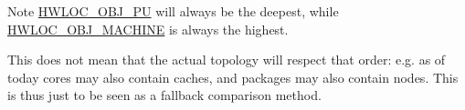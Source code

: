 \begin{DoxyNote}{Note}
\hyperlink{a00184_ggacd37bb612667dc437d66bfb175a8dc55abca6887e80cb291353b0a0c1da83f661}{H\+W\+L\+O\+C\+\_\+\+O\+B\+J\+\_\+\+PU} will always be the deepest, while \hyperlink{a00184_ggacd37bb612667dc437d66bfb175a8dc55a3f4e83ffc4a259354959ae8a9eaa2a80}{H\+W\+L\+O\+C\+\_\+\+O\+B\+J\+\_\+\+M\+A\+C\+H\+I\+NE} is always the highest.

This does not mean that the actual topology will respect that order\+: e.\+g. as of today cores may also contain caches, and packages may also contain nodes. This is thus just to be seen as a fallback comparison method. 
\end{DoxyNote}
